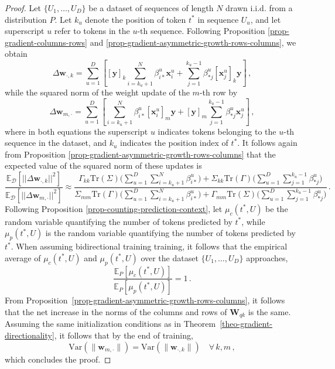 \begin{proof}
%
%
Let $\{U_1, \dots, U_D\}$ be a dataset of sequences of length $N$ drawn i.i.d. from a distribution $P$.
%
Let \( k_u \) denote the position of token \( t^* \) in sequence \( U_u \), and let superscript \( u \) refer to tokens in the \( u \)-th sequence.
%
Following Proposition \ref{prop-gradient-columns-rows} and \ref{prop-gradient-asymmetric-growth-rows-columns}, we obtain 
%
\begin{equation}
\Delta \bm{w}_{\cdot, k}  =  \sum_{u=1}^D \left[[\bm{y}]_k \sum_{i=k_u+1}^N \beta^u_{i*}\bm{x}^u_i + \sum_{j=1}^{k_u-1} \beta^u_{*j}[\bm{x}^u_j]_k\bm{y}
\right] \,,
\end{equation}
%
while the squared norm of the weight update of the $m$-th row by
%
\begin{equation}
\Delta \bm{w}_{m, \cdot}  =  \sum_{u=1}^D \left[ \sum_{i=k_u+1}^N \beta^u_{i*}[\bm{x}^u_i]_m\bm{y} + [\bm{y}]_m\sum_{j=1}^{k_u-1} \beta^u_{*j}\bm{x}^u_j
\right]\,,
\end{equation}
%
where in both equations the superscript $u$ indicates tokens belonging to the $u$-th sequence in the dataset, and $k_u$ indicates the position index of $t^*$.
%
It follows again from Proposition \ref{prop-gradient-asymmetric-growth-rows-columns} that the expected value of the squared norm of these updates is
%
\begin{equation}
\frac{\mathbb{E}_{\mathcal{D}}\left[ ||\Delta \bm{w}_{\cdot, k}||^2 \right]}{\mathbb{E}_{\mathcal{D}}\left[ ||\Delta \bm{w}_{m, \cdot}||^2 \right]} \approx \frac{\Gamma_{kk}\text{Tr}(\Sigma)\big(\sum_{u=1}^D\sum_{i=k_u+1}^N \beta^u_{i*}\big) + \Sigma_{kk}\text{Tr}(\Gamma)\big(\sum_{u=1}^D\sum_{j=1}^{k_u-1} \beta^u_{*j}\big)}{\Sigma_{mm}\text{Tr}(\Gamma)\big(\sum_{u=1}^D\sum_{i=k_u+1}^N \beta^u_{i*}\big) + \Gamma_{mm}\text{Tr}(\Sigma)\big(\sum_{u=1}^D\sum_{j=1}^{k_u-1} \beta^u_{*j}\big)} \,.
\end{equation}
%
Following Proposition \ref{prop-counting-prediction-context}, let $\mu_c(t^*, U)$ be the random variable quantifying the number of tokens predicted by $t^*$, while $\mu_p(t^*, U)$ is the random variable quantifying the number of tokens predicted by $t^*$.
%
When assuming bidirectional training training, it follows that the empirical average of $\mu_c(t^*, U)$ and $\mu_p(t^*, U)$ over the dataset $\{U_1, \dots, U_D\}$ approaches,
%
\begin{equation}
    \frac{\mathbb{E}_P[\mu_c(t^*, U)]}{\mathbb{E}_P[\mu_p(t^*, U)]} = 1 \,.
\end{equation}
%
From Proposition~\ref{prop-gradient-asymmetric-growth-rows-columns}, it follows that the net increase in the norms of the columns and rows of \( \bm{W}_{qk} \) is the same.
%
Assuming the same initialization conditions as in Theorem~\ref{theo-gradient-directionality}, it follows that by the end of training,
%
\begin{equation}
    \mathrm{Var}(\|\bm{w}_{m, \cdot}\|) = \mathrm{Var}(\|\bm{w}_{\cdot, k}\|) \quad \forall\, k, m \,,
\end{equation}
%
which concludes the proof.
\end{proof}